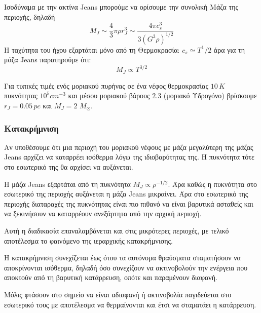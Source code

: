 \documentclass[a4paper,12pt]{memoir}
\newcommand{\sm}{$M_{\odot}$}
\begin{document}
Ισοδύναμα με την ακτίνα Jeans μπορούμε να ορίσουμε την συνολική Μάζα της περιοχής, δηλαδή
\begin{equation}
\boxed{M_J \sim \frac{4}{3} \pi \rho r_J ^3 \sim \frac{4\pi c_s ^3}{3 (G^3 \rho)^{1/2}}}
\end{equation}
Η ταχύτητα του ήχου εξαρτάται μόνο από τη Θερμοκρασία: $c_s \simeq T^1/2$ άρα για τη μάζα Jeans παρατηρούμε ότι:
\begin{equation}
M_J \propto T^{3/2}
\end{equation}

Για τυπικές τιμές ενός μοριακού πυρήνας σε ένα νέφος θερμοκρασίας $10 \, K$ πυκνότητας $10^5 cm^{-3}$ και μέσου μοριακού βάρους $2.3$ (μοριακό Υδρογόνο) βρίσκουμε $r_J=0.05 \,pc$ και $M_J =2$ \sm.

\subsubsection{Κατακρήμνιση}
Αν υποθέσουμε ότι μια περιοχή του μοριακού νέφους με μάζα μεγαλύτερη της μάζας Jeans αρχίζει να καταρρέει ισόθερμα λόγω της ιδιοβαρύτητας της. Η πυκνότητα τότε στο εσωτερικό της θα αρχίσει να αυξάνεται. 

Η μάζα Jeans εξαρτάται από τη πυκνότητα $M_J \propto \rho ^{-1/2}$. Άρα καθώς η πυκνότητα στο εσωτερικό της περιοχής αυξάνεται η μάζα Jeans μικραίνει. Άρα στο εσωτερικό της περιοχής διαταραχές της πυκνότητας είναι πιο πιθανό να είναι βαρυτικά ασταθείς και να ξεκινήσουν να καταρρέουν ανεξάρτητα από την αρχική περιοχή.

Αυτή η διαδικασία επαναλαμβάνεται και στις μικρότερες περιοχές, με τελικό αποτέλεσμα το φαινόμενο της ιεραρχικής κατακρήμνισης.

Η κατακρήμνιση συνεχίζεται έως ότου τα αυτόνομα θραύσματα σταματήσουν να αποκρίνονται ισόθερμα, δηλαδή όσο συνεχίζουν να ακτινοβολούν την ενέργεια που αποκτούν από τη βαρυτική κατάρρευση, οπότε και παραμένουν διαφανή. 

Μόλις φτάσουν στο σημείο να είναι αδιαφανή ή ακτινοβολία παγιδεύεται στο εσωτερικό τους με αποτέλεσμα να θερμαίνονται και έτσι να σταματάει η κατάρρευση.
\end{document}
